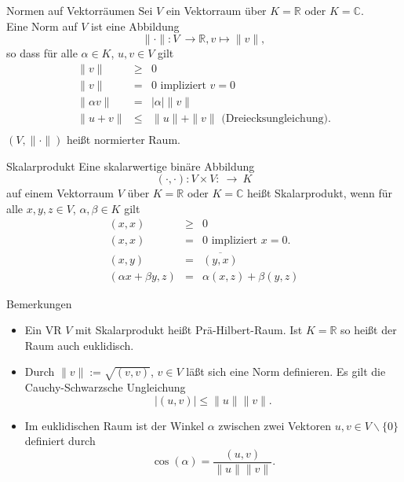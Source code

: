 \documentclass[notes=hide,hyperref={dvipdfmx,pdfpagelabels=false}]{beamer}
\begin{document}
\begin{frame}{Normen auf Vektorräumen}
Sei $V$ ein Vektorraum über $K=\mathbb{R}$ oder $K=\mathbb{C}$.\\
Eine {\color{red} Norm} auf $V$ ist eine Abbildung
\[ \| \cdot \|: V \ \rightarrow \mathbb{R}, v \mapsto \| v \|, \]
so dass für  alle $\alpha \in K$, $u,v \in V$ gilt 
\[ \begin{array} {rcl}
\| v \| & \geq & 0 \\
\| v \| & = & 0 \mbox{ impliziert } v=0\\
\| \alpha v \| & = & | \alpha | \| v \|\\
\| u + v \| & \leq & \| u \| + \| v \| \mbox{ (Dreiecksungleichung)}.\\
\end{array} \]
$(V,\| \cdot \|)$
heißt {\color{red} normierter Raum}.
\end{frame}

\begin{frame}[fragile]{Skalarprodukt}
Eine skalarwertige binäre Abbildung
\[ ( \cdot, \cdot ): V \times V: \ \rightarrow \ K\]
auf einem Vektorraum $V$ über $K=\mathbb{R}$ oder $K=\mathbb{C}$ heißt
{\color{red} Skalarprodukt}, wenn für alle $x,y,z \in V$, $\alpha, \beta \in
K$ gilt 
\begin{eqnarray*}
(x,x) & \geq & 0\\
(x,x) & = & 0 \mbox{ impliziert } x=0.\\
(x,y) & = & \overline{(y,x)}\\
(\alpha x+\beta y,z) & = & \alpha (x,z)+ \beta (y,z)
\end{eqnarray*}
\end{frame}

\begin{frame}{Bemerkungen}
\begin{itemize}
\item Ein VR $V$ mit Skalarprodukt heißt {\color{red} Prä-Hilbert-Raum}. Ist
$K=\mathbb{R}$ so heißt der Raum auch {\color{red} euklidisch}.
\item Durch $\|v\|:=\sqrt{(v,v)}$, $v \in V$ läßt sich eine Norm
definieren. Es gilt die {\color{red} Cauchy-Schwarzsche Ungleichung}
\[ |(u,v)| \leq \| u \| \|v\|. \]
\item Im euklidischen Raum ist der Winkel $\alpha$ zwischen zwei Vektoren
$u,v \in V\smallsetminus \{ 0 \}$ definiert durch
\[ \cos(\alpha) = \frac{(u,v)}{\|u\| \|v \|}. \]
   \end{itemize}
\end{frame}
\end{document}
